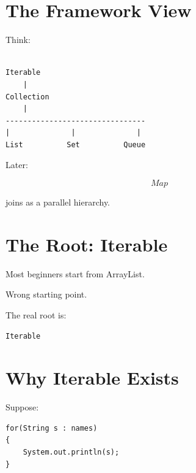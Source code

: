 \documentclass[11pt,a4paper]{book}
\begin{document}

\section{The Framework View}

Think:

\begin{verbatim}

Iterable
    |
Collection
    |
--------------------------------
|              |              |
List          Set          Queue

\end{verbatim}


Later:

\[
Map
\]


joins as a parallel hierarchy.


\section{The Root: Iterable}

Most beginners start from ArrayList.


Wrong starting point.


The real root is:

\begin{verbatim}
Iterable
\end{verbatim}


\section{Why Iterable Exists}

Suppose:

\begin{verbatim} 
for(String s : names)
{
    System.out.println(s);
}
\end{verbatim}

\end{document}
